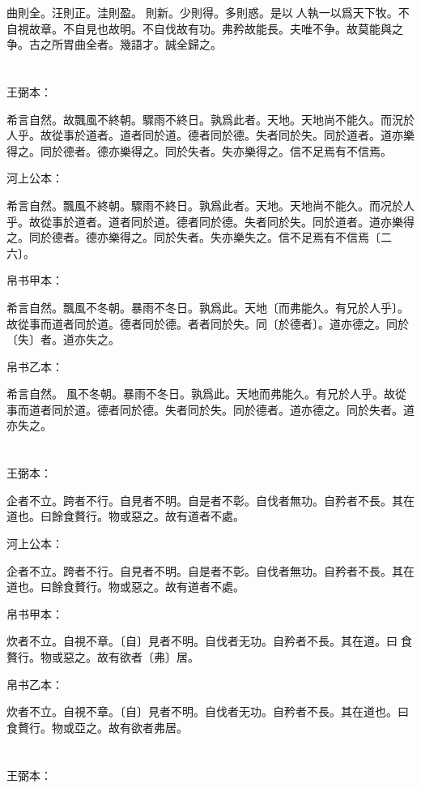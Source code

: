 \documentclass[a5paper]{ctexbook}
\begin{document}
    曲則全。汪則正。洼則盈。𧝬則新。少則得。多則惑。是以𦔻人執一以爲天下牧。不自視故章。不自見也故明。不自伐故有功。弗矜故能長。夫唯不争。故莫能與之争。古之所胃曲全者。幾語才。誠全歸之。

    \chapter{}
    王弼本：

    希言自然。故飄風不終朝。驟雨不終日。孰爲此者。天地。天地尚不能久。而況於人乎。故從事於道者。道者同於道。德者同於德。失者同於失。同於道者。道亦樂得之。同於德者。德亦樂得之。同於失者。失亦樂得之。信不足焉有不信焉。

    河上公本：

    希言自然。飄風不終朝。驟雨不終日。孰爲此者。天地。天地尚不能久。而况於人乎。故從事於道者。道者同於道。德者同於德。失者同於失。同於道者。道亦樂得之。同於德者。德亦樂得之。同於失者。失亦樂失之。信不足焉有不信焉〔二六〕。

    帛书甲本：

    希言自然。飄風不冬朝。暴雨不冬日。孰爲此。天地〔而弗能久。有兄於人乎〕。故從事而道者同於道。德者同於德。者者同於失。同〔於德者〕。道亦德之。同於〔失〕者。道亦失之。

    帛书乙本：

    希言自然。𠠕風不冬朝。暴雨不冬日。孰爲此。天地而弗能久。有兄於人乎。故從事而道者同於道。德者同於德。失者同於失。同於德者。道亦德之。同於失者。道亦失之。

    \chapter{}
    王弼本：

    企者不立。跨者不行。自見者不明。自是者不彰。自伐者無功。自矜者不長。其在道也。曰餘食贅行。物或惡之。故有道者不處。

    河上公本：

    企者不立。跨者不行。自見者不明。自是者不彰。自伐者無功。自矜者不長。其在道也。曰餘食贅行。物或惡之。故有道者不處。

    帛书甲本：

    炊者不立。自視不章。〔自〕見者不明。自伐者无功。自矜者不長。其在道。曰𥺌食贅行。物或惡之。故有欲者〔弗〕居。

    帛书乙本：

    炊者不立。自視不章。〔自〕見者不明。自伐者无功。自矜者不長。其在道也。曰𥺌食贅行。物或亞之。故有欲者弗居。

    \chapter{}
    王弼本：
\end{document}

